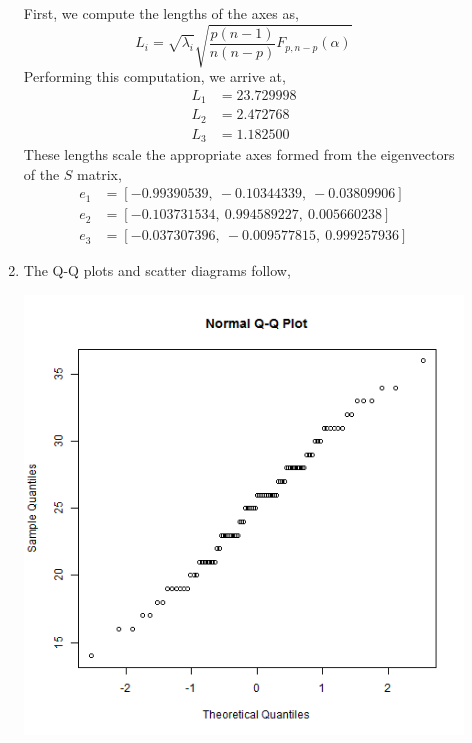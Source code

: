 \documentclass[letterpaper,10pt]{article}
\begin{document}
\begin{description}
\begin{enumerate}
First, we compute the lengths of the axes as,
\[L_i=\sqrt{\lambda_i}\sqrt{\frac{p(n-1)}{n(n-p)}F_{p,n-p}(\alpha)}\]
Performing this computation, we arrive at,
\begin{align*}
L_1 &= 23.729998\\
L_2 &= 2.472768\\
L_3 &= 1.182500
\end{align*}
These lengths scale the appropriate axes formed from the eigenvectors of the $S$ matrix,
\begin{align*}
e_1 &= [-0.99390539,\ -0.10344339,\ -0.03809906]\\
e_2 &= [-0.103731534,\  0.994589227,\ 0.005660238]\\
e_3 &= [-0.037307396,\ -0.009577815,\ 0.999257936]
\end{align*}
\item The Q-Q plots and scatter diagrams follow,
\begin{center}
\includegraphics[scale=.33]{QQSci.png}

\end{center}
\end{enumerate}
\end{description}
\end{document}
